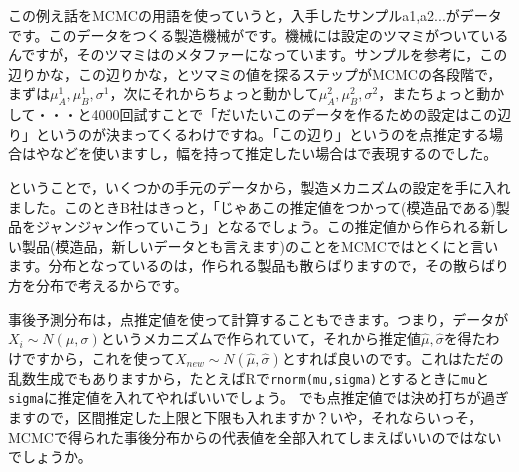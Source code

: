 \documentclass{ltjsbook}
\begin{document}
この例え話をMCMCの用語を使っていうと，入手したサンプルa1,a2...がデータです。このデータをつくる製造機械がです。機械には設定のツマミがついているんですが，そのツマミはのメタファーになっています。サンプルを参考に，この辺りかな，この辺りかな，とツマミの値を探るステップがMCMCの各段階で，まずは$\mu_A^1,\mu_B^1,\sigma^1$，次にそれからちょっと動かして$\mu_A^2,\mu_B^2,\sigma^2$，またちょっと動かして・・・と4000回試すことで「だいたいこのデータを作るための設定はこの辺り」というのが決まってくるわけですね。「この辺り」というのを点推定する場合はやなどを使いますし，幅を持って推定したい場合はで表現するのでした。

ということで，いくつかの手元のデータから，製造メカニズムの設定を手に入れました。このときB社はきっと，「じゃあこの推定値をつかって(模造品である)製品をジャンジャン作っていこう」となるでしょう。この推定値から作られる新しい製品(模造品，新しいデータとも言えます)のことをMCMCではとくにと言います。分布となっているのは，作られる製品も散らばりますので，その散らばり方を分布で考えるからです。

事後予測分布は，点推定値を使って計算することもできます。つまり，データが$X_{i}\sim N(\mu,\sigma)$というメカニズムで作られていて，それから推定値$\hat{\mu},\hat{\sigma}$を得たわけですから，これを使って$X_{new}\sim N(\hat{\mu},\hat{\sigma})$とすれば良いのです。これはただの乱数生成でもありますから，たとえばRで\verb|rnorm(mu,sigma)|とするときに\verb|mu|と\verb|sigma|に推定値を入れてやればいいでしょう。
でも点推定値では決め打ちが過ぎますので，区間推定した上限と下限も入れますか？いや，それならいっそ，MCMCで得られた事後分布からの代表値を全部入れてしまえばいいのではないでしょうか。
\end{document}
